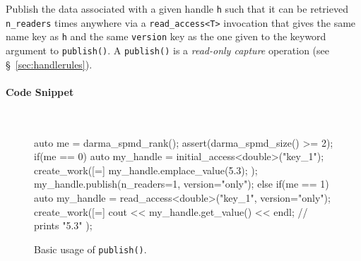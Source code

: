 Publish the data associated with a given handle \texttt{h} such that it can be
retrieved \texttt{n\_readers} times anywhere via a \texttt{read\_access<T>} invocation
that gives the same name key as \texttt{h} and the same \texttt{version} key as
the one given to the keyword argument to \texttt{publish()}.
A \texttt{publish()} is a {\it read-only capture} operation (see
\S~\ref{sec:handlerules}).

\paragraph{Code Snippet} \mbox{}\\
\begin{figure}[!h]
\begin{CppCodeNumb}
auto me = darma_spmd_rank();
assert(darma_spmd_size() >= 2);
if(me == 0) {
  auto my_handle = initial_access<double>("key_1");
  create_work([=]{
    my_handle.emplace_value(5.3);
  });
  my_handle.publish(n_readers=1, version="only");
}
else if(me == 1) {
  auto my_handle = read_access<double>("key_1", version="only");
  create_work([=]{
    cout << my_handle.get_value() << endl; // prints "5.3"
  });
}
\end{CppCodeNumb}
\label{fig:fe_api_publish}
\caption{Basic usage of \texttt{publish()}.}
\end{figure}

